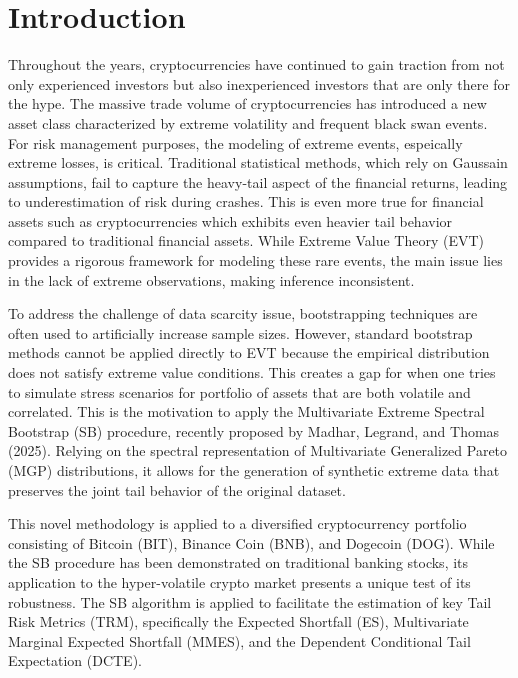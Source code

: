 \documentclass[a4paper,11pt]{article}
\begin{document}
\maketitle
\thispagestyle{empty}
\newpage

\setcounter{page}{1}  %


\section{Introduction}

Throughout the years, cryptocurrencies have continued to gain traction from not only experienced investors but also inexperienced investors that are only there for the hype.
The massive trade volume of cryptocurrencies has introduced a new asset class characterized by extreme volatility and frequent black swan events.
For risk management purposes, the modeling of extreme events, espeically extreme losses, is critical.
Traditional statistical methods, which rely on Gaussain assumptions, fail to capture the heavy-tail aspect of the financial returns, leading to underestimation of risk during crashes.
This is even more true for financial assets such as cryptocurrencies which exhibits even heavier tail behavior compared to traditional financial assets.
While Extreme Value Theory (EVT) provides a rigorous framework for modeling these rare events, the main issue lies in the lack of extreme observations, making inference inconsistent.

To address the challenge of data scarcity issue, bootstrapping techniques are often used to artificially increase sample sizes.
However, standard bootstrap methods cannot be applied directly to EVT because the empirical distribution does not satisfy extreme value conditions.
This creates a gap for when one tries to simulate stress scenarios for portfolio of assets that are both volatile and correlated.
This is the motivation to apply the Multivariate Extreme Spectral Bootstrap (SB) procedure, recently proposed by Madhar, Legrand, and Thomas (2025).
Relying on the spectral representation of Multivariate Generalized Pareto (MGP) distributions, it allows for the generation of synthetic extreme data that preserves the joint tail behavior of the original dataset.

This novel methodology is applied to a diversified cryptocurrency portfolio consisting of Bitcoin (BIT), Binance Coin (BNB), and Dogecoin (DOG).
While the SB procedure has been demonstrated on traditional banking stocks, its application to the hyper-volatile crypto market presents a unique test of its robustness.
The SB algorithm is applied to facilitate the estimation of key Tail Risk Metrics (TRM), specifically the Expected Shortfall (ES), Multivariate Marginal Expected Shortfall (MMES), and the Dependent Conditional Tail Expectation (DCTE).
\end{document}

